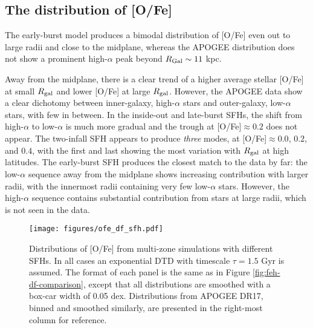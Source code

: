 \documentclass[modern,linenumbers]{aastex631}
\begin{document}

\subsection{The distribution of [O/Fe]}

The early-burst model produces a bimodal distribution of [O/Fe] even out to large radii and close to the midplane, whereas the APOGEE distribution does not show a prominent high-$\alpha$ peak beyond $R_{\rm{Gal}}\sim11$ kpc.

Away from the midplane, there is a clear trend of a higher average stellar [O/Fe] at small $R_{\rm gal}$ and lower [O/Fe] at large $R_{\rm gal}$. However, the APOGEE data show a clear dichotomy between inner-galaxy, high-$\alpha$ stars and outer-galaxy, low-$\alpha$ stars, with few in between. In the inside-out and late-burst SFHs, the shift from high-$\alpha$ to low-$\alpha$ is much more gradual and the trough at [O/Fe]$\approx0.2$ does not appear. The two-infall SFH appears to produce \textit{three} modes, at [O/Fe]$\approx 0.0$, $0.2$, and $0.4$, with the first and last showing the most variation with $R_{\rm gal}$ at high latitudes. The early-burst SFH produces the closest match to the data by far: the low-$\alpha$ sequence away from the midplane shows increasing contribution with larger radii, with the innermost radii containing very few low-$\alpha$ stars. However, the high-$\alpha$ sequence contains substantial contribution from stars at large radii, which is not seen in the data.

\begin{figure*}
    \centering
    \texttt{[image: figures/ofe\_df\_sfh.pdf]}
    \caption{Distributions of [O/Fe] from multi-zone simulations with different SFHs. In all cases an exponential DTD with timescale $\tau=1.5$ Gyr is assumed. The format of each panel is the same as in Figure \ref{fig:feh-df-comparison}, except that all distributions are smoothed with a box-car width of 0.05 dex. Distributions from APOGEE DR17, binned and smoothed similarly, are presented in the right-most column for reference.}
    \label{fig:ofe-df-sfh}
\end{figure*}
\end{document}
